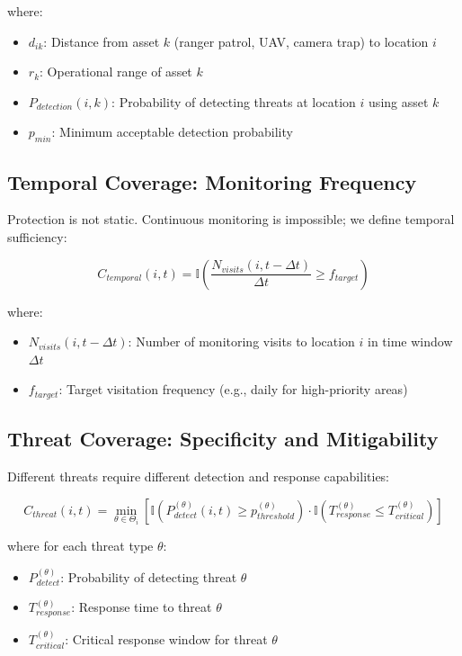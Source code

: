 where:
\begin{itemize}
\item $d_{ik}$: Distance from asset $k$ (ranger patrol, UAV, camera trap) to location $i$
\item $r_k$: Operational range of asset $k$
\item $P_{detection}(i,k)$: Probability of detecting threats at location $i$ using asset $k$
\item $p_{min}$: Minimum acceptable detection probability
\end{itemize}

\subsection{Temporal Coverage: Monitoring Frequency}

Protection is not static. Continuous monitoring is impossible; we define temporal sufficiency:

\begin{equation}
C_{temporal}(i,t) = \mathbb{I}\left(\frac{N_{visits}(i, t-\Delta t)}{\Delta t} \geq f_{target}\right)
\label{eq:temporal_coverage}
\end{equation}

where:
\begin{itemize}
\item $N_{visits}(i, t-\Delta t)$: Number of monitoring visits to location $i$ in time window $\Delta t$
\item $f_{target}$: Target visitation frequency (e.g., daily for high-priority areas)
\end{itemize}

\subsection{Threat Coverage: Specificity and Mitigability}

Different threats require different detection and response capabilities:

\begin{equation}
C_{threat}(i,t) = \min_{\theta \in \Theta_i}\left[\mathbb{I}(P_{detect}^{(\theta)}(i,t) \geq p_{threshold}^{(\theta)}) \cdot \mathbb{I}(T_{response}^{(\theta)} \leq T_{critical}^{(\theta)})\right]
\label{eq:threat_coverage}
\end{equation}

where for each threat type $\theta$:
\begin{itemize}
\item $P_{detect}^{(\theta)}$: Probability of detecting threat $\theta$
\item $T_{response}^{(\theta)}$: Response time to threat $\theta$
\item $T_{critical}^{(\theta)}$: Critical response window for threat $\theta$
\end{itemize}

